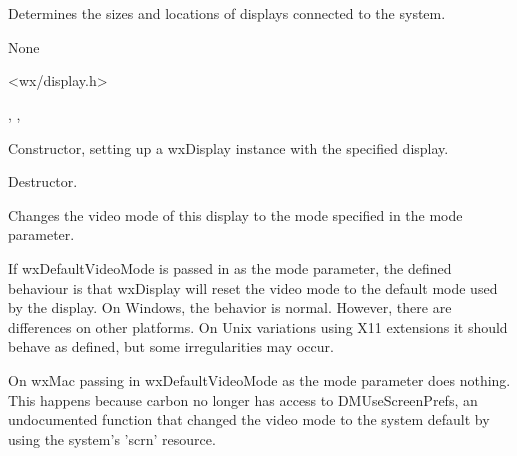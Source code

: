 \section{}\label{wxdisplay}

Determines the sizes and locations of displays connected to the system.


None


<wx/display.h>


, , 



\label{wxdisplayctor}


Constructor, setting up a wxDisplay instance with the specified display.




\label{wxdisplaydtor}


Destructor.


\label{wxdisplaychangemode}


Changes the video mode of this display to the mode specified
in the mode parameter.

If wxDefaultVideoMode is passed in as the mode parameter,
the defined behaviour is that wxDisplay will reset the video
mode to the default mode used by the display.  On Windows, 
the behavior is normal.  However, there are differences on other
platforms. On Unix variations using X11 extensions it should
behave as defined, but some irregularities may occur.  

On wxMac passing in wxDefaultVideoMode as the mode
parameter does nothing.  This happens because carbon 
no longer has access to DMUseScreenPrefs, an undocumented
function that changed the video mode to the system
default by using the system's 'scrn' resource.


